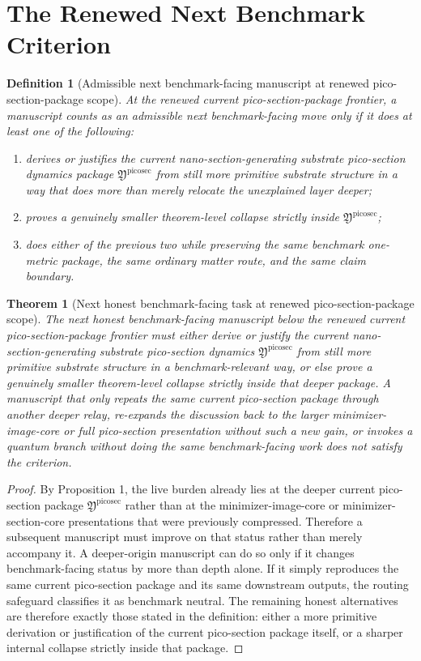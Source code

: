 \documentclass[11pt]{article}
\newcommand{\PicoSectionPackage}{\mathfrak Y^{\mathrm{picosec}}}
\newtheorem{definition}{Definition}
\newtheorem{theorem}{Theorem}
\begin{document}
\section{The Renewed Next Benchmark Criterion}

\begin{definition}[Admissible next benchmark-facing manuscript at renewed pico-section-package scope]
At the renewed current pico-section-package frontier, a manuscript counts as an admissible next benchmark-facing move only if it does at least one of the following:
\begin{enumerate}
    \item derives or justifies the current nano-section-generating substrate pico-section dynamics package \(\PicoSectionPackage\) from still more primitive substrate structure in a way that does more than merely relocate the unexplained layer deeper;
    \item proves a genuinely smaller theorem-level collapse strictly inside \(\PicoSectionPackage\);
    \item does either of the previous two while preserving the same benchmark one-metric package, the same ordinary matter route, and the same claim boundary.
\end{enumerate}
\end{definition}

\begin{theorem}[Next honest benchmark-facing task at renewed pico-section-package scope]
The next honest benchmark-facing manuscript below the renewed current pico-section-package frontier must either derive or justify the current nano-section-generating substrate pico-section dynamics \(\PicoSectionPackage\) from still more primitive substrate structure in a benchmark-relevant way, or else prove a genuinely smaller theorem-level collapse strictly inside that deeper package. A manuscript that only repeats the same current pico-section package through another deeper relay, re-expands the discussion back to the larger minimizer-image-core or full pico-section presentation without such a new gain, or invokes a quantum branch without doing the same benchmark-facing work does not satisfy the criterion.
\end{theorem}

\begin{proof}
By Proposition 1, the live burden already lies at the deeper current pico-section package \(\PicoSectionPackage\) rather than at the minimizer-image-core or minimizer-section-core presentations that were previously compressed. Therefore a subsequent manuscript must improve on that status rather than merely accompany it. A deeper-origin manuscript can do so only if it changes benchmark-facing status by more than depth alone. If it simply reproduces the same current pico-section package and its same downstream outputs, the routing safeguard classifies it as benchmark neutral. The remaining honest alternatives are therefore exactly those stated in the definition: either a more primitive derivation or justification of the current pico-section package itself, or a sharper internal collapse strictly inside that package.
\end{proof}
\end{document}
